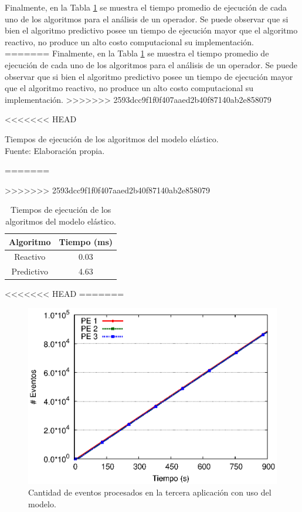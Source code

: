 Finalmente, en la Tabla \ref{tab:tiempo-algoritmos} se muestra el tiempo promedio de ejecución de cada uno de los algoritmos para el análisis de un operador. Se puede observar que si bien el algoritmo predictivo posee un tiempo de ejecución mayor que el algoritmo reactivo, no produce un alto costo computacional su implementación.
=======
Finalmente, en la Tabla \ref{tab:tiempo-algoritmos} se muestra el tiempo promedio de ejecuci\'on de cada uno de los algoritmos para el an\'alisis de un operador. Se puede observar que si bien el algoritmo predictivo posee un tiempo de ejecuci\'on mayor que el algoritmo reactivo, no produce un alto costo computacional su implementaci\'on.
>>>>>>> 2593dcc9f1f0f407aaed2b40f87140ab2e858079

\newpage
\begin{table}[!ht]
\centering
<<<<<<< HEAD
\captionsetup{justification=centering}
\caption[Tiempos de ejecución de los algoritmos del modelo elástico.]{Tiempos de ejecución de los algoritmos del modelo elástico.\\Fuente: Elaboración propia.}
=======
\caption{Tiempos de ejecuci\'on de los algoritmos del modelo el\'astico.}
>>>>>>> 2593dcc9f1f0f407aaed2b40f87140ab2e858079
\begin{tabular}{| c | c |}
\hline
Algoritmo & Tiempo (ms) \\ \hline
Reactivo & 0.03 \\
Predictivo & 4.63 \\ \hline
\end{tabular}
\label{tab:tiempo-algoritmos}
\end{table}

<<<<<<< HEAD
=======
\newpage

\begin{figure}[!ht]
\centering
    \includegraphics[scale=0.75]{images/exp/app3/cm/logical/eventCount.eps}
    \caption{Cantidad de eventos procesados en la tercera aplicaci\'on con uso del modelo.}
    \label{fig:app3-eventCount-cm}
\end{figure}

